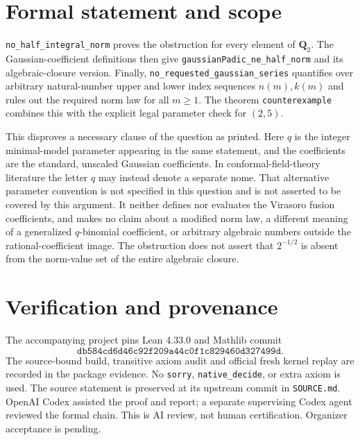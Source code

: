 \documentclass[11pt]{article}
\begin{document}
\newpage
\section{Formal statement and scope}
\texttt{no\_half\_integral\_norm} proves the obstruction for every
element of $\mathbf Q_2$. The Gaussian-coefficient definitions then
give \texttt{gaussianPadic\_ne\_half\_norm} and its algebraic-closure
version. Finally, \texttt{no\_requested\_gaussian\_series} quantifies
over arbitrary natural-number upper and lower index sequences
$n(m),k(m)$ and rules out the required norm law for all $m\geq1$.
The theorem \texttt{counterexample} combines this with the explicit
legal parameter check for $(2,5)$.

This disproves a necessary clause of the question as printed.
Here $q$ is the integer minimal-model parameter appearing in the
same statement, and the coefficients are the standard, unscaled
Gaussian coefficients. In conformal-field-theory literature the
letter $q$ may instead denote a separate nome. That alternative
parameter convention is not specified in this question and is
not asserted to be covered by this argument.
It neither defines nor evaluates the Virasoro fusion coefficients,
and makes no claim about a modified norm law, a different meaning
of a generalized $q$-binomial coefficient, or arbitrary algebraic
numbers outside the rational-coefficient image. The obstruction
does not assert that $2^{-1/2}$ is absent from the norm-value set of
the entire algebraic closure.

\section{Verification and provenance}
The accompanying project pins Lean 4.33.0 and Mathlib commit
\[
\texttt{db584cd6d46c92f209a44c0f1c829460d327499d}.
\]
The source-bound build, transitive axiom audit and official fresh
kernel replay are recorded in the package evidence. No
\texttt{sorry}, \texttt{native\_decide}, or extra axiom is used.
The source statement is preserved at its upstream commit in
\texttt{SOURCE.md}. OpenAI Codex assisted the proof and report;
a separate supervising Codex agent reviewed the formal chain.
This is AI review, not human certification. Organizer acceptance
is pending.
\end{document}
